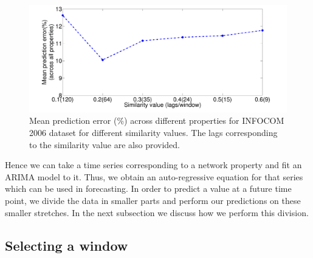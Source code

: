  \begin{figure}
 \begin{center}
  \includegraphics[width=0.75\columnwidth, angle=0]{./texfiles/Chapter_1/fig/error_similarity_val-eps-converted-to.pdf}
  \caption{\label{fig_err} Mean prediction error (\%) across different properties for INFOCOM 2006 dataset for different similarity values. The lags corresponding to the similarity 
  value are also provided.}
  \end{center}
 \end{figure}
 
Hence we can take a time series corresponding to a network property and fit an ARIMA model to it. Thus, we obtain an auto-regressive equation for that series which 
can be used 
in forecasting. 
In order to predict a value at a future time point, we divide the data in smaller parts and perform our predictions on these smaller stretches.
In the next subsection we discuss how we perform this division.

\subsection{Selecting a window}

